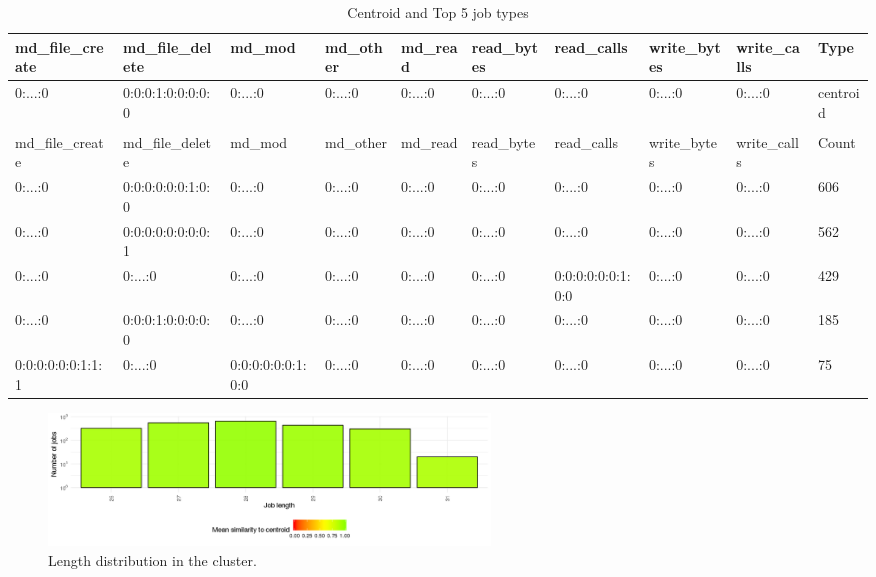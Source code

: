 \documentclass[]{llncs}
\begin{document}
\begin{table}
	\centering
	\begin{tiny}
		\begin{tabular}{@{ }l@{ }@{ }l@{ }@{ }l@{ }@{ }l@{ }@{ }l@{ }@{ }l@{ }@{ }l@{ }@{ }l@{ }@{ }l@{ }@{ }l@{ }}
			md\_file\_create  & md\_file\_delete  & md\_mod           & md\_other & md\_read & read\_bytes & read\_calls       & write\_bytes & write\_calls & Type     \\ 
			\hline
			0:...:0           & 0:0:0:1:0:0:0:0:0 & 0:...:0           & 0:...:0   & 0:...:0  & 0:...:0     & 0:...:0           & 0:...:0      & 0:...:0      & centroid \\ 
			&                   &                   &           &          &             &                   &              &              &          \\ 
			md\_file\_create  & md\_file\_delete  & md\_mod           & md\_other & md\_read & read\_bytes & read\_calls       & write\_bytes & write\_calls & Count    \\ 
			\hline
			0:...:0           & 0:0:0:0:0:0:1:0:0 & 0:...:0           & 0:...:0   & 0:...:0  & 0:...:0     & 0:...:0           & 0:...:0      & 0:...:0      & 606      \\ 
			0:...:0           & 0:0:0:0:0:0:0:0:1 & 0:...:0           & 0:...:0   & 0:...:0  & 0:...:0     & 0:...:0           & 0:...:0      & 0:...:0      & 562      \\ 
			0:...:0           & 0:...:0           & 0:...:0           & 0:...:0   & 0:...:0  & 0:...:0     & 0:0:0:0:0:0:1:0:0 & 0:...:0      & 0:...:0      & 429      \\ 
			0:...:0           & 0:0:0:1:0:0:0:0:0 & 0:...:0           & 0:...:0   & 0:...:0  & 0:...:0     & 0:...:0           & 0:...:0      & 0:...:0      & 185      \\ 
			0:0:0:0:0:0:1:1:1 & 0:...:0           & 0:0:0:0:0:0:1:0:0 & 0:...:0   & 0:...:0  & 0:...:0     & 0:...:0           & 0:...:0      & 0:...:0      & 75       \\ 
		\end{tabular}
	\end{tiny}
  \caption{Centroid and Top 5 job types}
  \label{tab:hex_lev:top_jobs}
\end{table}


\begin{figure}
  \centering
  \includegraphics[width=4.61in,height=1.39in]{./media/image5.png}
  \caption{Length distribution in the cluster.}
  \label{fig:hex_lev:length}
\end{figure}
\end{document}
